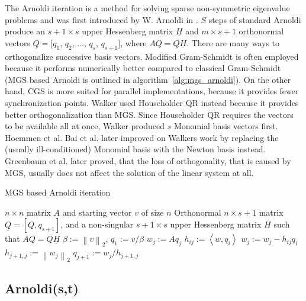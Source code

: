 \documentclass{scrartcl}
\numberwithin{equation}{section}
\newcommand{\norm}[1]{\left\lVert#1\right\rVert}
\begin{document}
The Arnoldi iteration is a method for solving sparse non-symmetric eigenvalue problems and was first introduced by W. Arnoldi in \cite{arnoldi:hal-01712943}. $S$ steps of standard Arnoldi produce an $s + 1 \times s$ upper Hessenberg matrix $\underline{H}$ and $m \times s + 1$ orthonormal vectors $\underline{Q} = [q_1$, $q_2$, $\ldots$, $q_s$, $q_{s + 1}]$, where $AQ = \underline{Q} \underline{H}$. There are many ways to orthogonalize successive basis vectors. Modified Gram-Schmidt is often employed because it performs numerically better compared to classical Gram-Schmidt (MGS based Arnoldi is outlined in algorithm~\ref{alg:mgs_arnoldi}). On the other hand, CGS is more suited for parallel implementations, because it provides fewer synchronization points.
Walker \cite{doi:10.1137/Walker} used Householder QR instead because it provides better orthogonalization than MGS. Since Householder QR requires the vectors to be available all at once, Walker produced $s$ Monomial basis vectors first. Hoemmen et al. Bai et al. \cite{doi:10.1093/imanum/NewtonGMRES_bai} later improved on Walkers work by replacing the (usually ill-conditioned) Monomial basis with the Newton basis instead. Greenbaum et al. \cite{Greenbaum97numericalbehaviour} later proved, that the loss of orthogonality, that is caused by MGS, usually does not affect the solution of the linear system at all.
\begin{algorithm}[H]
\caption{MGS based Arnoldi iteration}
\label{alg:mgs_arnoldi}
\begin{algorithmic}[1]
    \REQUIRE $n \times n$ matrix $A$ and  starting vector $v$ of size $n$
	\ENSURE Orthonormal $n \times s + 1$ matrix $\underline{Q} = [Q,q_{s + 1}]$, and a non-singular $s + 1 \times s$ upper Hessenberg matrix $\underline{H}$ such that $AQ = \underline{Q} \underline{H}$
    \STATE $\beta := \norm{v}_2$, $q_1 := v/\beta$ 
		\STATE $w_j := Aq_j$
			\STATE $h_{ij} :=  \left< w, q_i \right>$
			\STATE $w_j := w_j - h_{ij}q_i$
		\ENDFOR
		\STATE $h_{j + 1, j} := \norm{w_j}_2$
		\STATE $q_{j + 1} := w_j / h_{j + 1, j}$
	\ENDFOR
\end{algorithmic}
\end{algorithm}

\subsection{Arnoldi(s,t)}
\end{document}

